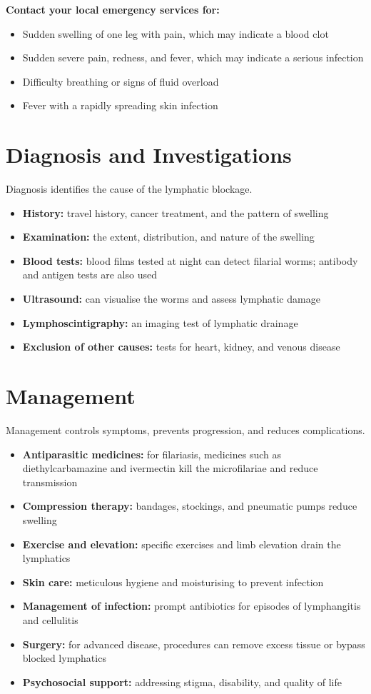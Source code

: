 \textbf{Contact your local emergency services for:}
\begin{itemize}
    \item Sudden swelling of one leg with pain, which may indicate a blood clot
    \item Sudden severe pain, redness, and fever, which may indicate a serious infection
    \item Difficulty breathing or signs of fluid overload
    \item Fever with a rapidly spreading skin infection
\end{itemize}

\section*{Diagnosis and Investigations}
Diagnosis identifies the cause of the lymphatic blockage.
\begin{itemize}
    \item \textbf{History:} travel history, cancer treatment, and the pattern of swelling
    \item \textbf{Examination:} the extent, distribution, and nature of the swelling
    \item \textbf{Blood tests:} blood films tested at night can detect filarial worms; antibody and antigen tests are also used
    \item \textbf{Ultrasound:} can visualise the worms and assess lymphatic damage
    \item \textbf{Lymphoscintigraphy:} an imaging test of lymphatic drainage
    \item \textbf{Exclusion of other causes:} tests for heart, kidney, and venous disease
\end{itemize}

\section*{Management}
Management controls symptoms, prevents progression, and reduces complications.
\begin{itemize}
    \item \textbf{Antiparasitic medicines:} for filariasis, medicines such as diethylcarbamazine and ivermectin kill the microfilariae and reduce transmission
    \item \textbf{Compression therapy:} bandages, stockings, and pneumatic pumps reduce swelling
    \item \textbf{Exercise and elevation:} specific exercises and limb elevation drain the lymphatics
    \item \textbf{Skin care:} meticulous hygiene and moisturising to prevent infection
    \item \textbf{Management of infection:} prompt antibiotics for episodes of lymphangitis and cellulitis
    \item \textbf{Surgery:} for advanced disease, procedures can remove excess tissue or bypass blocked lymphatics
    \item \textbf{Psychosocial support:} addressing stigma, disability, and quality of life
\end{itemize}

